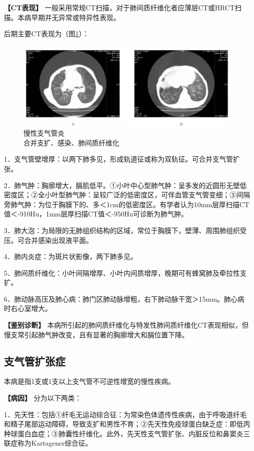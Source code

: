 \textbf{【CT表现】}
一般采用常规CT扫描，对于肺间质纤维化者应薄层CT或HRCT扫描。本病早期并无异常或特异性表现。

后期主要CT表现为（图\ref{fig9-5}）：

\begin{figure}[!htbp]
 \centering
 \includegraphics[width=.7\textwidth,height=\textheight,keepaspectratio]{./images/Image00188.jpg}
 \captionsetup{justification=centering}
 \caption{慢性支气管炎\\{\small 合并支扩、感染、肺间质纤维化}}
 \label{fig9-5}
  \end{figure} 

1．支气管壁增厚：以两下肺多见，形成轨道征或称为双轨征。可合并支气管扩张。

2．肺气肿：胸廓增大，膈肌低平。①小叶中心型肺气肿：呈多发的近圆形无壁低密度区；②全小叶型肺气肿：呈较广泛的低密度区，可伴血管支气管变细；③间隔旁肺气肿：为位于胸膜下的、多＜1cm的低密度区。有学者认为10mm层厚扫描CT值＜-910Hu，1mm层厚扫描CT值＜-950Hu可诊断为肺气肿。

3．肺大泡：为局限的无肺组织结构的区域，常位于胸膜下，壁薄、周围肺组织受压。可合并感染出现液平面。

4．肺内炎症：为斑片状影像，两下肺多见。

5．肺间质纤维化：小叶间隔增厚、小叶内间质增厚，晚期可有蜂窝肺及牵拉性支扩。

6．肺动脉高压及肺心病：肺门区肺动脉增粗，右下肺动脉干宽＞15mm。肺心病时右心室增大。

\textbf{【鉴别诊断】}
本病所引起的肺间质纤维化与特发性肺间质纤维化CT表现相似，但慢支常引起肺气肿改变，且有显著的胸廓增大和膈位置下降。

\subsection{支气管扩张症}

本病是指1支或1支以上支气管不可逆性增宽的慢性疾病。

\textbf{【病因】} 分为以下两类：

1．先天性：包括①纤毛无运动综合征：为常染色体遗传性疾病，由于呼吸道纤毛和精子尾部运动障碍，导致支扩和男性不育；②先天性免疫球蛋白缺乏症：即低丙种球蛋白血症；③肺囊性纤维化。此外，先天性支气管扩张、内脏反位和鼻窦炎三联症称为Kartagener综合征。

